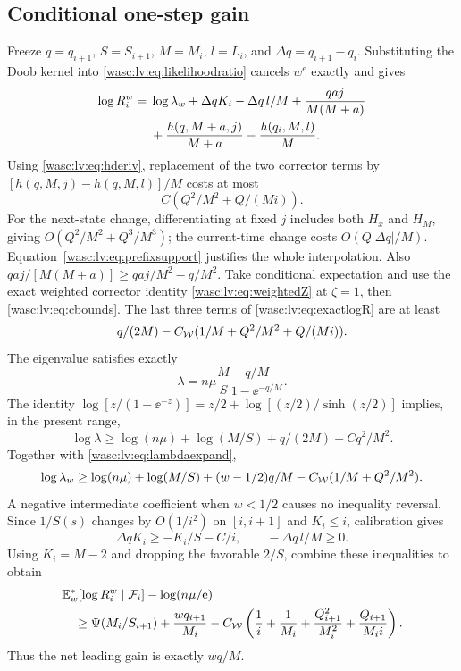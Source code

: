 \documentclass[11pt,a4paper]{article}
\theoremstyle{remark}\newtheorem{remark}[theorem]{Remark}
\numberwithin{equation}{section}
\begin{document}
\subsection{Conditional one-step gain}
Freeze $q=q_{i+1}$, $S=S_{i+1}$, $M=M_i$, $l=L_i$, and $\Delta q=q_{i+1}-q_i$.
Substituting the Doob kernel into \eqref{wasc:lv:eq:likelihoodratio} cancels $w^e$ exactly and gives
\begin{align}\label{wasc:lv:eq:exactlogR}
\log R_i^w={}&\log\lambda_w+\Delta qK_i-\Delta q\,l/M
+\frac{qaj}{M(M+a)}\notag\\
&+\frac{h(q,M+a,j)}{M+a}-\frac{h(q_i,M,l)}M.
\end{align}
Using \eqref{wasc:lv:eq:hderiv}, replacement of the two corrector terms by
$[h(q,M,j)-h(q,M,l)]/M$ costs at most
\begin{equation}\label{wasc:lv:eq:lowerreplacement}
C(Q^2/M^2+Q/(Mi)).
\end{equation}
For the next-state change, differentiating at fixed $j$ includes both $H_x$ and $H_M$, giving $O(Q^2/M^2+Q^3/M^3)$; the current-time change costs $O(Q|\Delta q|/M)$. Equation~\eqref{wasc:lv:eq:prefixsupport} justifies the whole interpolation.
Also
$qaj/[M(M+a)]\ge qaj/M^2-q/M^2$.
Take conditional expectation and use the exact weighted corrector identity
\eqref{wasc:lv:eq:weightedZ} at $\zeta=1$, then \eqref{wasc:lv:eq:cbounds}. The last three terms of \eqref{wasc:lv:eq:exactlogR} are at least
\begin{equation}\label{wasc:lv:eq:correctedlower}
q/(2M)-C_{\mathcal W}(1/M+Q^2/M^2+Q/(Mi)).
\end{equation}
The eigenvalue satisfies exactly
\[
\lambda=n\mu\frac MS\frac{q/M}{1-\ee^{-q/M}}.
\]
The identity
$\log[z/(1-\ee^{-z})]=z/2+\log[(z/2)/\sinh(z/2)]$ implies, in the present range,
\[
\log\lambda\ge\log(n\mu)+\log(M/S)+q/(2M)-Cq^2/M^2.
\]
Together with \eqref{wasc:lv:eq:lambdaexpand},
\begin{equation}\label{wasc:lv:eq:weightedeigenlower}
\log\lambda_w\ge\log(n\mu)+\log(M/S)
+(w-1/2)q/M-C_{\mathcal W}(1/M+Q^2/M^2).
\end{equation}
A negative intermediate coefficient when $w<1/2$ causes no inequality reversal.
Since $1/S(s)$ changes by $O(1/i^2)$ on $[i,i+1]$ and $K_i\le i$, calibration gives
\[
\Delta qK_i\ge-K_i/S-C/i,\qquad -\Delta q\,l/M\ge0.
\]
Using $K_i=M-2$ and dropping the favorable $2/S$, combine these inequalities to obtain
\begin{align}\label{wasc:lv:eq:lowerstep}
&\mathbb E_w^*[\log R_i^w\mid\mathcal F_i]-\log(n\mu/\mathrm e)\notag\\
&\quad\ge\Psi(M_i/S_{i+1})+\frac{wq_{i+1}}{M_i}
-C_{\mathcal W}\left(\frac1i+\frac1{M_i}+\frac{Q_{i+1}^2}{M_i^2}+
\frac{Q_{i+1}}{M_i i}\right).
\end{align}
Thus the net leading gain is exactly $wq/M$.
\end{document}
